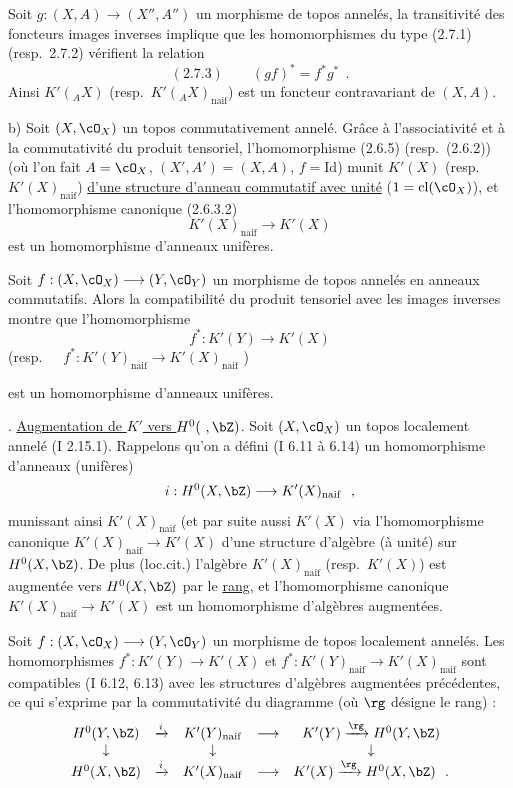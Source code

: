 Soit $g : (X, A) \longrightarrow (X'', A'')$ un morphisme de topos annel\'{e}s, la transitivit\'{e} des foncteurs images inverses implique que les homomorphismes du type (2.7.1) (resp.\ 2.7.2) v\'{e}rifient la relation
\[
\mathrm{(2.7.3)} \qquad (gf)^* = f^*g^*\ \ .
\]
Ainsi $K'({}_A X)$ (resp.\ $K'({}_A X)_{\mathrm{naif}}$) est un foncteur contravariant de $(X, A)$.

\smallskip

b) Soit $(X, \cO_X)$ un topos commutativement annel\'{e}. Gr\^{a}ce \`{a} l'associativit\'{e} et \`{a} la commutativit\'{e} du produit tensoriel, l'homomorphisme (2.6.5) (resp.\ (2.6.2)) (o\`{u} l'on fait $A = \cO_X$, $(X', A') = (X, A)$, $f = \mathrm{Id}$) munit $K'(X)$ (resp.\ $K'(X)_{\mathrm{naif}}$) \underline{d'une structure d'anneau commutatif avec unit\'{e}} ($1 = \mathrm{cl}(\cO_X)$), et l'homomorphisme canonique (2.6.3.2)
\[
K'(X)_{\mathrm{naif}} \longrightarrow K'(X)
\]
est un homomorphisme d'anneaux unif\`{e}res.

Soit $f : (X, \cO_X) \longrightarrow (Y, \cO_Y)$ un morphisme de topos annel\'{e}s en anneaux commutatifs. Alors la compatibilit\'{e} du produit tensoriel avec les images inverses montre que l'homomorphisme
\[
f^* : K'(Y) \longrightarrow K'(X)
\]
(resp.\ $\quad f^* : K'(Y)_{\mathrm{naif}} \longrightarrow K'(X)_{\mathrm{naif}}$ \quad )

est un homomorphisme d'anneaux unif\`{e}res.

\medskip

. \underline{Augmentation de $K'$ vers $H^0(\ , \bZ)$}. Soit $(X, \cO_X)$ un topos localement annel\'{e} (I 2.15.1). Rappelons qu'on a d\'{e}fini (I 6.11 \`{a} 6.14) un homomorphisme d'anneaux (unif\`{e}res)
\[
i : H^0(X, \bZ) \longrightarrow K'(X)_{\mathrm{naif}}\ \ ,
\]
munissant ainsi $K'(X)_{\mathrm{naif}}$ (et par suite aussi $K'(X)$ via l'homomorphisme canonique $K'(X)_{\mathrm{naif}} \longrightarrow K'(X)$ d'une structure d'alg\`{e}bre (\`{a} unit\'{e}) sur $H^0(X, \bZ)$. De plus (loc.cit.) l'alg\`{e}bre $K'(X)_{\mathrm{naif}}$ (resp.\ $K'(X)$) est augment\'{e}e vers $H^0(X, \bZ)$ par le \underline{rang}, et l'homomorphisme canonique $K'(X)_{\mathrm{naif}} \longrightarrow K'(X)$ est un homomorphisme d'alg\`{e}bres augment\'{e}es.

Soit $f : (X, \cO_X) \longrightarrow (Y, \cO_Y)$ un morphisme de topos localement annel\'{e}s. Les homomorphismes $f^* : K'(Y) \longrightarrow K'(X)$ et $f^* : K'(Y)_{\mathrm{naif}} \longrightarrow K'(X)_{\mathrm{naif}}$ sont compatibles (I 6.12, 6.13) avec les structures d'alg\`{e}bres augment\'{e}es pr\'{e}c\'{e}dentes, ce qui s'exprime par la commutativit\'{e} du diagramme (o\`{u} $\rg$ d\'{e}signe le rang) :
\[
\begin{array}{ccccc}
H^0(Y, \bZ) & \xrightarrow{i} & K'(Y)_{\mathrm{naif}} & \longrightarrow & K'(Y) \xrightarrow{\rg} H^0(Y, \bZ) \\
\downarrow & & \downarrow & & \downarrow \\
H^0(X, \bZ) & \xrightarrow{i} & K'(X)_{\mathrm{naif}} & \longrightarrow & K'(X) \xrightarrow{\rg} H^0(X, \bZ)\ \ .
\end{array}
\]

